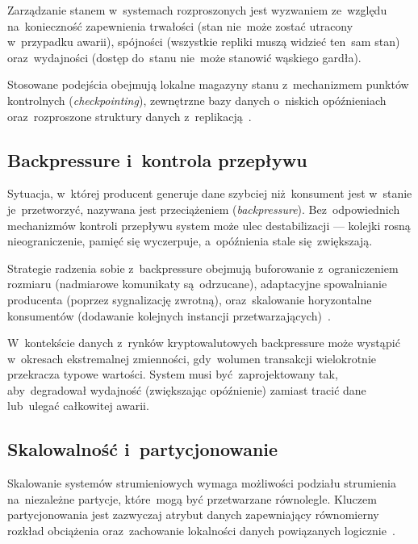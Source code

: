 Zarządzanie stanem w~systemach rozproszonych jest wyzwaniem ze~względu na~konieczność zapewnienia trwałości
(stan nie~może zostać utracony w~przypadku awarii), spójności (wszystkie repliki muszą widzieć ten~sam stan)
oraz~wydajności (dostęp do~stanu nie~może stanowić wąskiego gardła).

Stosowane podejścia obejmują lokalne magazyny stanu z~mechanizmem punktów kontrolnych (\textit{checkpointing}),
zewnętrzne bazy danych o~niskich opóźnieniach oraz~rozproszone struktury danych z~replikacją~\cite{flink}.

\subsection[Backpressure i kontrola przepływu]{Backpressure i~kontrola przepływu}
\label{subsec:backpressure}

Sytuacja, w~której producent generuje dane szybciej niż~konsument jest w~stanie je~przetworzyć, nazywana jest
przeciążeniem (\textit{backpressure}).
Bez~odpowiednich mechanizmów kontroli przepływu system może ulec destabilizacji --- kolejki rosną nieograniczenie,
pamięć się wyczerpuje, a~opóźnienia stale się~zwiększają.

Strategie radzenia sobie z~backpressure obejmują buforowanie z~ograniczeniem rozmiaru (nadmiarowe komunikaty
są~odrzucane), adaptacyjne spowalnianie producenta (poprzez sygnalizację zwrotną), oraz~skalowanie horyzontalne
konsumentów (dodawanie kolejnych instancji przetwarzających)~\cite{google_sre_book}.

W~kontekście danych z~rynków kryptowalutowych backpressure może wystąpić w~okresach ekstremalnej zmienności,
gdy~wolumen transakcji wielokrotnie przekracza typowe wartości.
System musi być~zaprojektowany tak, aby~degradował wydajność (zwiększając opóźnienie) zamiast tracić dane lub~ulegać
całkowitej awarii.

\subsection[Skalowalność i partycjonowanie]{Skalowalność i~partycjonowanie}
\label{subsec:skalowalnosc}

Skalowanie systemów strumieniowych wymaga możliwości podziału strumienia na~niezależne partycje, które~mogą być
przetwarzane równolegle.
Kluczem partycjonowania jest zazwyczaj atrybut danych zapewniający równomierny rozkład obciążenia oraz~zachowanie
lokalności danych powiązanych logicznie~\cite{scaling}.


